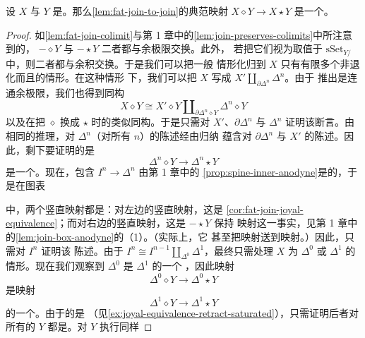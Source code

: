 \begin{proposition}\label{prop:fat-join-joyal-equivalence}
设 $X$ 与 $Y$ 是\trSimplicialSets{}。那么\cref{lem:fat-join-to-join}的典范映射
$X \diamond Y \to X \star Y$ 是一个\trJoyalEquivalence{}。
\end{proposition}

\begin{proof}
如\cref{lem:fat-join-colimit}与第 1 章中的\cref{lem:join-preserves-colimits}中所注意到的，
\trFunctor{} $- \diamond Y$ 与 $- \star Y$ 二者都与\trFiltered{}余极限交换。此外，
若把它们视为取值于 $\mathrm{sSet}_{Y/}$ 中，则二者都与余积交换。于是我们可以把一般
情形化归到 $X$ 只有有限多个非退化\trSimplex{}而且\trConnected{}的情形。在这种情形
下，我们可以把 $X$ 写成\trPushout{} $X' \amalg_{\partial\Delta^n} \Delta^n$。由于
推出是连通余极限，我们也得到同构
\[
X \diamond Y \cong X' \diamond Y \amalg_{\partial\Delta^n \diamond Y} \Delta^n \diamond Y
\]
以及在把 $\diamond$ 换成 $\star$ 时的类似同构。于是只需对 $X'$、$\partial\Delta^n$
与 $\Delta^n$ 证明该断言。由相同的推理，对 $\Delta^n$（对所有 $n$）的陈述经由归纳
蕴含对 $\partial\Delta^n$ 与 $X'$ 的陈述。因此，剩下要证明的是
\[
\Delta^n \diamond Y \longrightarrow \Delta^n \star Y
\]
是一个\trJoyalEquivalence{}。现在，包含 $I^n \to \Delta^n$ 由第 1 章中的%
\cref{prop:spine-inner-anodyne}是\trInnerAnodyne{}的，于是在图表
\begin{center}
\end{center}
中，两个竖直映射都是\trJoyalEquivalence{}：对左边的竖直映射，这是%
\cref{cor:fat-join-joyal-equivalence}；而对右边的竖直映射，这是 $- \star Y$ 保持%
\trInnerAnodyne{}映射这一事实，见第 1 章中的\cref{lem:join-box-anodyne}的（1）。（实际上，它
甚至把\trRightAnodyne{}映射送到\trInnerAnodyne{}映射。）因此，只需对 $I^n$ 证明该
陈述。由于 $I^n \cong I^{n-1} \amalg_{\Delta^0} \Delta^1$，最终只需处理 $X$ 为
$\Delta^0$ 或 $\Delta^1$ 的情形。现在我们观察到 $\Delta^0$ 是 $\Delta^1$ 的一个%
\trRetract{}，因此映射
\[
\Delta^0 \diamond Y \longrightarrow \Delta^0 \star Y
\]
是映射
\[
\Delta^1 \diamond Y \longrightarrow \Delta^1 \star Y
\]
的一个\trRetract{}。由于\trJoyalEquivalence{}的\trRetract{}是\trJoyalEquivalence{}%
（见\cref{ex:joyal-equivalence-retract-saturated}），只需证明后者对所有的 $Y$ 都是\trJoyalEquivalence{}。对 $Y$ 执行同样

\end{proof}
